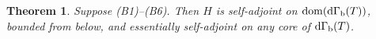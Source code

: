 \documentclass[12pt]{article}
\theoremstyle{plain}
\newtheorem{thm}[theorem]{\bf Theorem}
\numberwithin{equation}{section}
\theoremstyle{remark}
\begin{document}
\begin{thm}{\label{saH}}
  Suppose (B1)--(B6).
 Then $H$ is self-adjoint on $\mathop{\mathrm{dom}}(\mathrm{d\Gamma_b}(T))$, bounded from below, 
and essentially self-adjoint on any core of $\mathrm{d\Gamma_b}(T)$.
\end{thm}

\begin{comment}
\begin{proof}
First we write $H$ as
\begin{align*}
  H = \dGb(T) + V_N + V_N'
\end{align*}
with 
\[
V_N := \frac{1}{2} \sum_{n=1}^N \lambda_n \PhiS(g_n)^2, \qquad V_N' = \frac{1}{2}\sum_{n=N+1}^\infty \lambda_n \PhiS(g_n)^2.
\]
Let $0<\vep<1$ be as in (B5).
By (B3) and (B4), for any $0<\eta<\vep/2$, one can take a sufficiently large $N\in\NN$ and some constant $C_1(\eta)>0$ such that 
\begin{align}
  \norm{V_N'\Psi} \leq \eta \norm{\dGb(T)\Psi} + C_1(\eta)\norm{\Psi},
 \qquad \Psi\in\dom(\dGb(T)).   \label{BD0}
\end{align}
By (B6), we have $\Im\inner{g_n}{g_m}=0$, and thus $\{\PhiS(g_n)\}_n$ are strongly commuting
self-adjoint operators.
Let us define $\cM:=\mathrm{L.h.}\{T^{-1/2}g_1,\cdots,T^{-1/2}g_N\}$ and $M:=\dim \cM$.
Let $P_\cM$ be the orthogonal projection on $\cM$.
Then, by (B3) and (B5), 
\begin{align*}
  G_N := \sum_{n=1}^N \lambda_n \ket{T^{-1/2}g_n}\bra{T^{-1/2}g_n} \geq \left(\frac{\vep}{2}-1\right)P_\cM
\end{align*}
for all sufficiently large $N$. We decompose $G_N$ as $G_N=G_N^+-G_N^-$ with $G_N^\pm\geq 0$.
Then, we have $-G_N^- \geq (\vep/2-1)P_\cM$, and so
\begin{align}
 0 \leq  G_N^- \leq 1-\frac{\vep}{2}.   \label{bdGN-}
\end{align}
Let $\{e_j\}_{j=1}^M$ be the result of applying Gram-Schmidt to $\{T^{-1/2}g_1,\cdots, T^{-1/2}g_N\}$.
Note that $e_j$ are real combinations of $T^{-1/2}g_1,\cdots,T^{-1/2}g_N$, and hence $e_j\in\dom(T)$.
Also, by (B6), $Je_j=e_j$ and $\langle e_j,T^{-1/2}g_n\rangle\in\RR$.
We set $\Phi_j := \PhiS(T^{1/2}e_j)$ for each $j=1,\cdots,M$.
Thus we have
\begin{align}
 \sum_{n=1}^N \lambda_n \PhiS(g_n)^2
& = \sum_{n=1}^N \lambda_n \sum_{j,\ell=1}^M \inner{e_j}{T^{-1/2}g_n} \inner{e_\ell}{T^{-1/2}g_n} \Phi_j \Phi_\ell \notag \\
& = \sum_{j,\ell=1}^M  (G_N)_{j\ell} \Phi_j\Phi_\ell  \notag \\

\end{comment}
\end{document}
